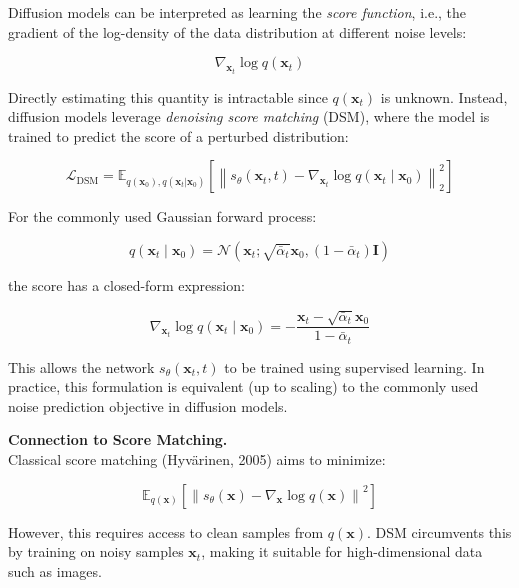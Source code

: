 Diffusion models can be interpreted as learning the \textit{score function}, i.e., the gradient of the log-density of the data distribution at different noise levels:

\begin{equation}
\nabla_{\mathbf{x}_t} \log q(\mathbf{x}_t)
\end{equation}

Directly estimating this quantity is intractable since $q(\mathbf{x}_t)$ is unknown. Instead, diffusion models leverage \textit{denoising score matching} (DSM), where the model is trained to predict the score of a perturbed distribution:

\begin{equation}
\mathcal{L}_{\text{DSM}} =
\mathbb{E}_{q(\mathbf{x}_0), q(\mathbf{x}_t|\mathbf{x}_0)}
\left[
\left\|
s_\theta(\mathbf{x}_t, t)
-
\nabla_{\mathbf{x}_t}
\log q(\mathbf{x}_t \mid \mathbf{x}_0)
\right\|_2^2
\right]
\end{equation}

For the commonly used Gaussian forward process:

\begin{equation}
q(\mathbf{x}_t \mid \mathbf{x}_0) =
\mathcal{N}(\mathbf{x}_t; \sqrt{\bar{\alpha}_t}\mathbf{x}_0, (1-\bar{\alpha}_t)\mathbf{I})
\end{equation}

the score has a closed-form expression:

\begin{equation}
\nabla_{\mathbf{x}_t} \log q(\mathbf{x}_t \mid \mathbf{x}_0)
=
-\frac{\mathbf{x}_t - \sqrt{\bar{\alpha}_t}\mathbf{x}_0}{1 - \bar{\alpha}_t}
\end{equation}

This allows the network $s_\theta(\mathbf{x}_t, t)$ to be trained using supervised learning. In practice, this formulation is equivalent (up to scaling) to the commonly used noise prediction objective in diffusion models.

\vspace{0.5em}
\noindent
\textbf{Connection to Score Matching.} \\
Classical score matching (Hyvärinen, 2005) aims to minimize:

\begin{equation}
\mathbb{E}_{q(\mathbf{x})}
\left[
\left\|
s_\theta(\mathbf{x}) - \nabla_{\mathbf{x}} \log q(\mathbf{x})
\right\|^2
\right]
\end{equation}

However, this requires access to clean samples from $q(\mathbf{x})$. DSM circumvents this by training on noisy samples $\mathbf{x}_t$, making it suitable for high-dimensional data such as images.

